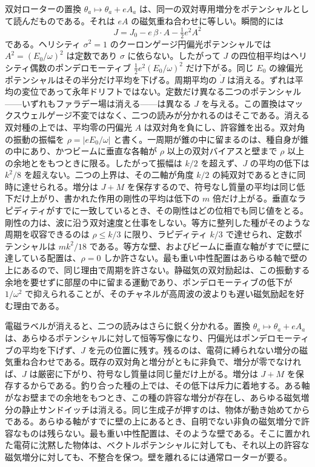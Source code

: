 \documentclass[a4paper]{article}
\begin{document}
双対ローターの置換 $\theta_a\mapsto\theta_a+e A_a$ は、同一の双対専用増分をポテンシャルとして読んだものである。それは $eA$ の磁気重ね合わせに等しい。瞬間的には
\begin{equation}
\label{eq:ponderomotive-J}
J=J_0-e\,\beta\cdot A-\tfrac12 e^2 A^2
\end{equation}
である。ヘリシティ $\sigma^2=1$ のクーロンゲージ円偏光ポテンシャルでは $A^2=(E_0/\omega)^2$ は定数であり $\sigma$ に依らない。したがって $J$ の四位相平均はヘリシティ偶数のポンデロモーティブ $\tfrac12 e^2(E_0/\omega)^2$ だけ下がる。同じ $E_0$ の線偏光ポテンシャルはその半分だけ平均を下げる。周期平均の $\dot J$ は消える。ずれは平均の変位であって永年ドリフトではない。定数だけ異なる二つのポテンシャル——いずれもファラデー場は消える——は異なる $J$ を与える。この置換はマックスウェルゲージ不変ではなく、二つの読みが分かれるのはそこである。消える双対種の上では、平均零の円偏光 $A$ は双対角を負にし、許容錐を出る。双対角の振動の振幅を $\rho=|e E_0/\omega|$ と書く。一周期が錐の中に留まるのは、種自身が錐の中にあり、かつビームに垂直な各軸が $\rho$ 以上の双対バイアスと壁まで $\rho$ 以上の余地とをもつときに限る。したがって振幅は $k/2$ を超えず、$J$ の平均の低下は $k^2/8$ を超えない。二つの上界は、その二軸が角度 $k/2$ の純双対であるときに同時に達せられる。増分は $J+M$ を保存するので、符号なし質量の平均は同じ低下だけ上がり、書かれた作用の剛性の平均は低下の $m$ 倍だけ上がる。垂直なラピディティがすでに一致しているとき、その剛性はどの位相でも同じ値をとる。剛性の力は、波に沿う双対速度と仕事をしない。等方に整列した種がそのような周期を収容できるのは $\rho\le k/3$ に限り、ラピディティ $k/3$ で達せられ、定数ポテンシャルは $mk^2/18$ である。等方な壁、およびビームに垂直な軸がすでに壁に達している配置は、$\rho=0$ しか許さない。最も重い中性配置はあらゆる軸で壁の上にあるので、同じ理由で周期を許さない。静磁気の双対励起は、この振動する余地を要せずに部屋の中に留まる運動であり、ポンデロモーティブの低下が $1/\omega^2$ で抑えられることが、そのチャネルが高周波の波よりも遅い磁気励起を好む理由である。

電磁ラベルが消えると、二つの読みはさらに鋭く分かれる。置換 $\theta_a\mapsto\theta_a+e A_a$ は、あらゆるポテンシャルに対して恒等写像になり、円偏光はポンデロモーティブの平均を下げず、$J$ を元の位置に残す。残るのは、電荷に縛られない増分の磁気重ね合わせである。既存の双対角と増分がともに非負で、増分が零でなければ、$J$ は厳密に下がり、符号なし質量は同じ量だけ上がる。増分は $J+M$ を保存するからである。釣り合った種の上では、その低下は斥力に着地する。ある軸がなお壁までの余地をもつとき、この種の許容な増分が存在し、あらゆる磁気増分の静止サンドイッチは消える。同じ生成子が押すのは、物体が動き始めてからである。あらゆる軸がすでに壁の上にあるとき、自明でない非負の磁気増分で許容なものは残らない。最も重い中性配置は、そのような壁である。そこに置かれた電荷に沈黙した物体は、ベクトルポテンシャルに対しても、それ以上の許容な磁気増分に対しても、不整合を保つ。壁を離れるには通常ローターが要る。
\end{document}
